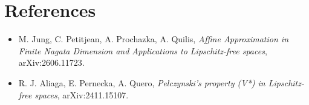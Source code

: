 \documentclass[11pt]{article}
\begin{document}
\section*{References}

\begin{itemize}
\item M. Jung, C. Petitjean, A. Prochazka, A. Quilis,
\emph{Affine Approximation in Finite Nagata Dimension and Applications to
Lipschitz-free spaces}, arXiv:2606.11723.
\item R. J. Aliaga, E. Pernecka, A. Quero,
\emph{Pelczynski's property (V*) in Lipschitz-free spaces}, arXiv:2411.15107.
\end{itemize}
\end{document}

